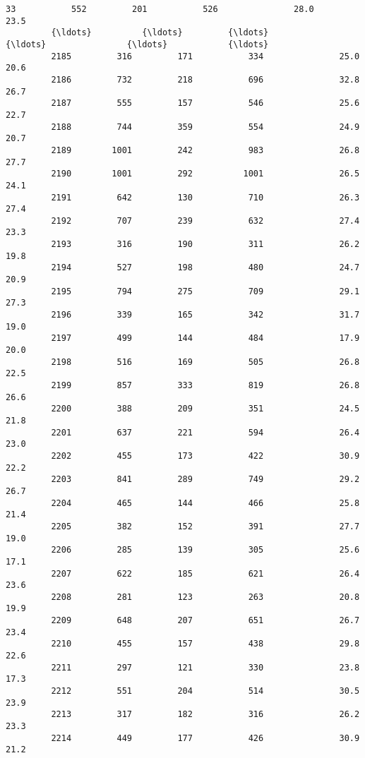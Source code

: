 \documentclass[11pt]{llncs}
\begin{document}
\begin{Verbatim}[commandchars=\\\{\}]
         33           552         201           526               28.0           23.5   
         {\ldots}          {\ldots}         {\ldots}           {\ldots}                {\ldots}            {\ldots}   
         2185         316         171           334               25.0           20.6   
         2186         732         218           696               32.8           26.7   
         2187         555         157           546               25.6           22.7   
         2188         744         359           554               24.9           20.7   
         2189        1001         242           983               26.8           27.7   
         2190        1001         292          1001               26.5           24.1   
         2191         642         130           710               26.3           27.4   
         2192         707         239           632               27.4           23.3   
         2193         316         190           311               26.2           19.8   
         2194         527         198           480               24.7           20.9   
         2195         794         275           709               29.1           27.3   
         2196         339         165           342               31.7           19.0   
         2197         499         144           484               17.9           20.0   
         2198         516         169           505               26.8           22.5   
         2199         857         333           819               26.8           26.6   
         2200         388         209           351               24.5           21.8   
         2201         637         221           594               26.4           23.0   
         2202         455         173           422               30.9           22.2   
         2203         841         289           749               29.2           26.7   
         2204         465         144           466               25.8           21.4   
         2205         382         152           391               27.7           19.0   
         2206         285         139           305               25.6           17.1   
         2207         622         185           621               26.4           23.6   
         2208         281         123           263               20.8           19.9   
         2209         648         207           651               26.7           23.4   
         2210         455         157           438               29.8           22.6   
         2211         297         121           330               23.8           17.3   
         2212         551         204           514               30.5           23.9   
         2213         317         182           316               26.2           23.3   
         2214         449         177           426               30.9           21.2   
         

\end{Verbatim}
\end{document}
